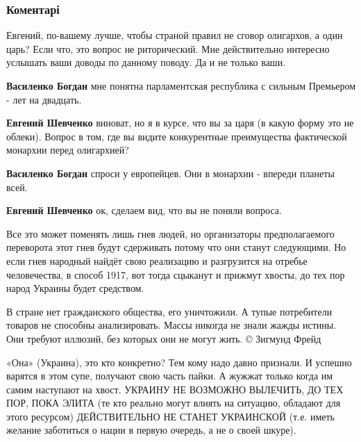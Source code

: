  
 
 
 
 
\subsubsection{Коментарі}

\begin{itemize} %
Евгений, по-вашему лучше, чтобы страной правил не сговор олигархов, а один царь?
Если что, это вопрос не риторический. Мне действительно интересно услышать ваши доводы по данному поводу.
Да и не только ваши.

\begin{itemize} %
\textbf{Василенко Богдан} мне понятна парламентская республика с сильным Премьером - лет на двадцать.

\textbf{Евгений Шевченко} виноват, но я в курсе, что вы за царя (в какую форму это не облеки).
Вопрос в том, где вы видите конкурентные преимущества фактической монархии перед олигархией?


\textbf{Василенко Богдан} спроси у европейцев. Они в монархии - впереди планеты всей.

\textbf{Евгений Шевченко} ок, сделаем вид, что вы не поняли вопроса.
\end{itemize} %


Все это может поменять лишь гнев людей, но организаторы предполагаемого
переворота этот гнев будут сдерживать потому что они станут следующими. Но если
гнев народный найдёт свою реализацию и разгрузится на отребье человечества, в
способ 1917, вот тогда сцыканут и прижмут хвосты, до тех пор народ Украины
будет средством.


В стране нет гражданского общества, его уничтожили. А тупые потребители товаров не способны анализировать.
Массы никогда не знали жажды истины. Они требуют иллюзий, без которых они не могут жить.
©️ Зигмунд Фрейд

«Она» (Украина), это кто конкретно?
Тем кому надо давно признали. И успешно варятся в этом супе, получают свою часть пайки. А жужжат только когда им самим наступают на хвост.
УКРАИНУ НЕ ВОЗМОЖНО ВЫЛЕЧИТЬ, ДО ТЕХ ПОР, ПОКА ЭЛИТА (те кто реально могут влиять на ситуацию, обладают для этого ресурсом) ДЕЙСТВИТЕЛЬНО НЕ СТАНЕТ УКРАИНСКОЙ (т.е. иметь желание заботиться о нации в первую очередь, а не о своей шкуре).


\end{itemize}
